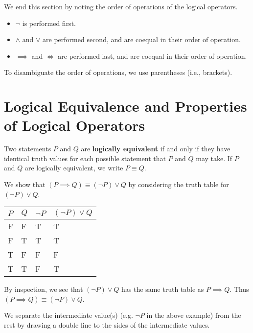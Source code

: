 We end this section by noting the order of operations of the logical operators.
\begin{itemize}
    \item $\lnot$ is performed first.
    \item $\land$ and $\lor$ are performed second, and are coequal in their order of operation.
    \item $\implies$ and $\iff$ are performed last, and are coequal in their order of operation.
\end{itemize}
To disambiguate the order of operations, we use parentheses (i.e., brackets).

\section{Logical Equivalence and Properties of Logical Operators}
\begin{definition}
    Two statements $P$ and $Q$ are \textbf{logically equivalent} if and only if they have identical truth values for each possible statement that $P$ and $Q$ may take. If $P$ and $Q$ are logically equivalent, we write $P \equiv Q$.
\end{definition}
\begin{example}
    We show that $(P \implies Q) \equiv (\lnot P) \lor Q$ by considering the truth table for $(\lnot P) \lor Q$.
    \begin{table}[h]
        \centering
        \begin{tabular}{|l|l||l||l|}
            \hline
            $P$ & $Q$ & $\lnot P$ & $(\lnot P) \lor Q$ \\ \hline
            F   & F   & T         & T                  \\ \hline
            F   & T   & T         & T                  \\ \hline
            T   & F   & F         & F                  \\ \hline
            T   & T   & F         & T                  \\ \hline
        \end{tabular}
    \end{table}

    By inspection, we see that $(\lnot P) \lor Q$ has the same truth table as $P \implies Q$. Thus $(P \implies Q) \equiv (\lnot P) \lor Q$.
\end{example}
\begin{remark}
    We separate the intermediate value(s) (e.g. $\lnot P$ in the above example) from the rest by drawing a double line to the sides of the intermediate values.
\end{remark}

